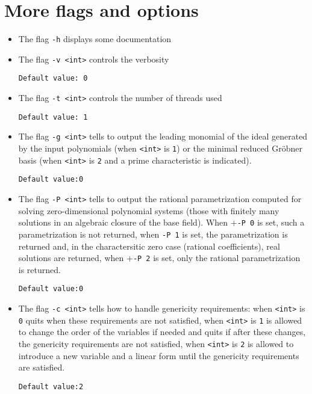 \documentclass[a4paper,english,11pt]{scrartcl}
\theoremstyle{definition}
\theoremstyle{remark}
\begin{document}


\section{More flags and options}

\begin{itemize}
\item The flag \verb+-h+ displays some documentation

\item The flag \verb+-v <int>+ controls the verbosity

  \hfill \verb+Default value: 0+

\item The flag \verb+-t <int>+ controls the number of threads used

  \hfill \verb+Default value: 1+

\item The flag \verb+-g <int>+ tells \msolve to output the leading monomial of
  the ideal generated by the input polynomials (when \verb+<int>+ is \verb+1+)
  or the minimal reduced Gr\"obner basis (when \verb+<int>+ is \verb+2+ and
  a prime characteristic is indicated).

  \hfill \verb+Default value:0+

\item The flag \verb+-P <int>+ tells \msolve to output the 
rational parametrization computed for solving zero-dimensional polynomial 
systems (those with finitely many solutions in an algebraic closure of the base field).
When +\verb+-P 0+ is set, such a parametrization is not returned, when \verb+-P 1+ is
set, the parametrization is returned and, in the charactersitic zero case (rational 
coefficients), real solutions are returned, when +\verb+-P 2+ is set, only the 
rational parametrization is returned.

  \hfill \verb+Default value:0+


\item The flag \verb+-c <int>+ tells \msolve how to handle genericity
  requirements: when \verb+<int>+ is \verb+0+ \msolve quits when these
  requirements are not satisfied, when \verb+<int>+ is \verb+1+ \msolve is
  allowed to change the order of the variables if needed and quits if after
  these changes, the genericity requirements are not satisfied,  when
  \verb+<int>+ is \verb+2+ \msolve is allowed to introduce a new variable and a
  linear form until the genericity requirements are satisfied. 

  \hfill \verb+Default value:2+

\end{itemize}
\end{document}
